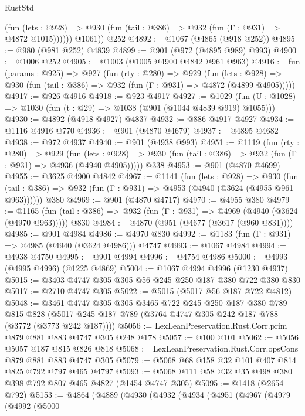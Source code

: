 \begin{lexlean}{RustStd}
\begin{coremodule}
{\begin{coremodule}
{{{{{{{{{{{{{{              (fun (lets : @928) =>
              @930 (fun (tail : @386) => @932 (fun (Γ : @931) => @4872 @1015))))))
        @1061))
    @252
@4892 := @1067 (@4865 (@918 @252))
@4895 := @980 (@981 @252) @4839
@4899 := @901 (@972 (@4895 @989) @993)
@4900 := @1006 @252
@4905 := @1003 (@1005 @4900 @4842 @961 @963)
@4916 := fun (params : @925) =>
  @927
    (fun (rty : @280) =>
    @929
      (fun (lets : @928) =>
      @930 (fun (tail : @386) => @932 (fun (Γ : @931) => @4872 (@4899 @4905)))))
@4917 := @926 @4916
@4918 := @923 @4917
@4927 := @1029 (fun (U : @1028) => @1030 (fun (t : @29) => @1038 (@901 (@1044 @4839 @919) @1055)))
@4930 := @4892 (@4918 @4927) @4837
@4932 := @886 @4917 @4927
@4934 := @1116 @4916 @770
@4936 := @901 (@4870 @4679)
@4937 := @4895 @4682
@4938 := @972 @4937
@4940 := @901 (@4938 @993)
@4951 := @1119
    (fun (rty : @280) =>
    @929
      (fun (lets : @928) =>
      @930 (fun (tail : @386) => @932 (fun (Γ : @931) => @4936 (@4940 @4905)))))
    @338
@4953 := @901 (@4870 @4699)
@4955 := @3625 @4900 @4842
@4967 := @1141
    (fun (lets : @928) =>
    @930 (fun (tail : @386) => @932 (fun (Γ : @931) => @4953 (@4940 (@3624 (@4955 @961 @963))))))
    @380
@4969 := @901 (@4870 @4717)
@4970 := @4955 @380
@4979 := @1165
    (fun (tail : @386) => @932 (fun (Γ : @931) => @4969 (@4940 (@3624 (@4970 @963)))))
    @830
@4984 := @4870 (@951 (@4677 (@3617 (@960 @831))))
@4985 := @901 @4984
@4986 := @4970 @830
@4992 := @1183 (fun (Γ : @931) => @4985 (@4940 (@3624 @4986))) @4747
@4993 := @1067 @4984
@4994 := @4938 @4750
@4995 := @901 @4994
@4996 := @4754 @4986
@5000 := @4993 (@4995 @4996) (@1225 @4869)
@5004 := @1067 @4994 @4996 (@1230 @4937)
@5015 := @3403 @4747 @305 @305 @56 @245 @250 @187 @380 @722 @380 @830
@5017 := @2710 @4747 @305
@5022 := @5015 (@5017 @56 @187 @722 @4812)
@5048 := @3461
    @4747
    @305
    @305
    @3465
    @722
    @245
    @250
    @187
    @380
    @789
    @815
    @828
    (@5017 @245 @187 @789 (@3764 @4747 @305 @242 @187 @788 (@3772 (@3773 @242 @187))))
@5056 := LexLeanPreservation.Rust.Corr.prim @879 @881 @883 @4747 @305 @248 @178
@5057 := @100 @101
@5062 := @5056 @5057 @187 @815 @826 @818
@5068 := LexLeanPreservation.Rust.Corr.opsCons @879 @881 @883 @4747 @305
@5079 := @5068 @68 @158 @32 @101 @407 @814 @825 @792 @797 @465 @4797
@5093 := @5068 @111 @58 @32 @35 @498 @380 @398 @792 @807 @465 @4827 (@1454 @4747 @305)
@5095 := @1418 (@2654 @792)
@5153 := @4864
    (@4889
      (@4930
        (@4932
          (@4934
            (@4951
              (@4967
                (@4979
                  (@4992
                    (@5000
}}}}}}}}}}}}}}
\end{coremodule}}
\end{coremodule}
\end{lexlean}
